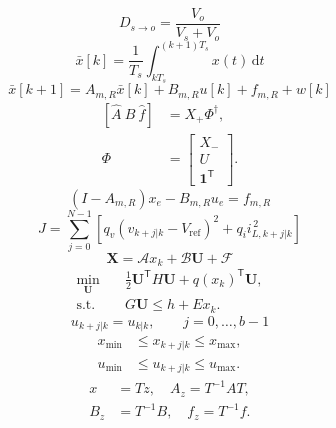 \begin{equation}D_{s\to o}=\frac{V_o}{V_s+V_o}\end{equation}
\begin{equation}\bar{x}[k]=\frac{1}{T_s}\int_{kT_s}^{(k+1)T_s}x(t)\,\mathrm{d}t\end{equation}
\begin{equation}\bar{x}[k+1]=A_{m,R}\bar{x}[k]+B_{m,R}u[k]+f_{m,R}+w[k]\end{equation}
\begin{equation}\begin{aligned}[\hat A\ \hat B\ \hat f]&=X_+\Phi^\dagger,\\ \Phi&=\begin{bmatrix}X_-\\ U\\ \mathbf 1^{\mathsf T}\end{bmatrix}.\end{aligned}\end{equation}
\begin{equation}(I-A_{m,R})x_e-B_{m,R}u_e=f_{m,R}\end{equation}
\begin{equation}J=\sum_{j=0}^{N-1}\left[q_v(v_{k+j|k}-V_{\mathrm{ref}})^2+q_i i_{L,k+j|k}^{\,2}\right]\end{equation}
\begin{equation}\mathbf X=\mathcal A x_k+\mathcal B\mathbf U+\mathcal F\end{equation}
\begin{equation}\begin{aligned}\min_{\mathbf U}\quad&\tfrac12\mathbf U^{\mathsf T}H\mathbf U+q(x_k)^{\mathsf T}\mathbf U,\\ \mathrm{s.t.}\quad&G\mathbf U\le h+E x_k.\end{aligned}\end{equation}
\begin{equation}u_{k+j|k}=u_{k|k},\qquad j=0,\ldots,b-1\end{equation}
\begin{equation}\begin{aligned}x_{\min}&\le x_{k+j|k}\le x_{\max},\\ u_{\min}&\le u_{k+j|k}\le u_{\max}.\end{aligned}\end{equation}
\begin{equation}\begin{aligned}x&=Tz,\quad A_z=T^{-1}AT,\\ B_z&=T^{-1}B,\quad f_z=T^{-1}f.\end{aligned}\end{equation}
